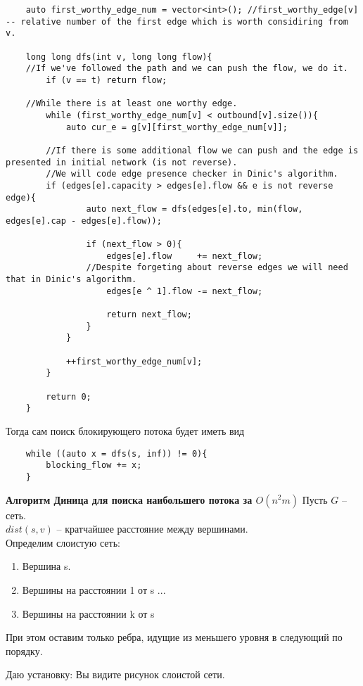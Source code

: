 \begin{lstlisting}
	auto first_worthy_edge_num = vector<int>(); //first_worthy_edge[v] -- relative number of the first edge which is worth considiring from v.

	long long dfs(int v, long long flow){
	//If we've followed the path and we can push the flow, we do it.
		if (v == t) return flow;

	//While there is at least one worthy edge.
		while (first_worthy_edge_num[v] < outbound[v].size()){
			auto cur_e = g[v][first_worthy_edge_num[v]];
		
		//If there is some additional flow we can push and the edge is presented in initial network (is not reverse).
		//We will code edge presence checker in Dinic's algorithm.
		if (edges[e].capacity > edges[e].flow && e is not reverse edge){
				auto next_flow = dfs(edges[e].to, min(flow, edges[e].cap - edges[e].flow));

				if (next_flow > 0){
					edges[e].flow     += next_flow;
				//Despite forgeting about reverse edges we will need that in Dinic's algorithm. 
					edges[e ^ 1].flow -= next_flow;

					return next_flow;
				}
			}
		
			++first_worthy_edge_num[v];
		}

		return 0;
	}
\end{lstlisting}

Тогда сам поиск блокирующего потока будет иметь вид
\begin{lstlisting}
	while ((auto x = dfs(s, inf)) != 0){
		blocking_flow += x;
	}
\end{lstlisting}


\textbf{Алгоритм Диница для поиска наибольшего потока за $O(n^2 m)$}
Пусть $G$ -- сеть. \\
$dist(s, v)$ -- кратчайшее расстояние между вершинами. \\

Определим слоистую сеть: \\
\begin{enumerate}
	\setcounter{enumi}{0}
	\item Вершина s.
	\item Вершины на расстоянии 1 от s
	...
	\setcounter{enumi}{10} %
	\item Вершины на расстоянии k от s
\end{enumerate}
При этом оставим только ребра, идущие из меньшего уровня в следующий по порядку.

Даю установку: Вы видите рисунок слоистой сети.



